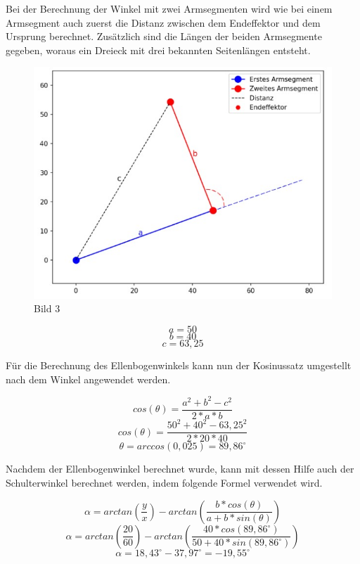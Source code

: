 \documentclass[12pt]{article}
\begin{document}
    Bei der Berechnung der Winkel mit zwei Armsegmenten wird wie bei einem Armsegment auch zuerst
    die Distanz zwischen dem Endeffektor und dem Ursprung berechnet. Zusätzlich sind die Längen der
    beiden Armsegmente gegeben, woraus ein Dreieck mit drei bekannten Seitenlängen entsteht.

    \begin{figure}[h]
        \centering
        \includegraphics[width = \linewidth]{Bild 3}
        \caption{Bild 3}
    \end{figure}

    \[
        a=50
    \]
    \[
        b=40
    \]
    \[
        c=63,25
    \]

    Für die Berechnung des Ellenbogenwinkels kann nun der Kosinussatz umgestellt nach dem Winkel
    angewendet werden.

    \[
        cos(\theta)= \frac{a^2+b^2-c^2}{2*a*b}
    \]
    \[
        cos(\theta)= \frac{50^2+40^2-63,25^2}{2*20*40}
    \]
    \[
        \theta= arccos(0,025) = 89,86^\circ
    \]

    Nachdem der Ellenbogenwinkel berechnet wurde, kann mit dessen Hilfe auch der Schulterwinkel
    berechnet werden, indem folgende Formel verwendet wird.

    \[
        \alpha = arctan(\frac{y}{x}) - arctan(\frac{b*cos(\theta)}{a+b*sin(\theta)})
    \]
    \[
        \alpha = arctan(\frac{20}{60}) - arctan(\frac{40*cos(89,86^\circ)}{50+40*sin(89,86^\circ)})                    \]
    \[
        \alpha = 18,43^\circ - 37,97^\circ = -19,55^\circ
    \]
\end{document}
